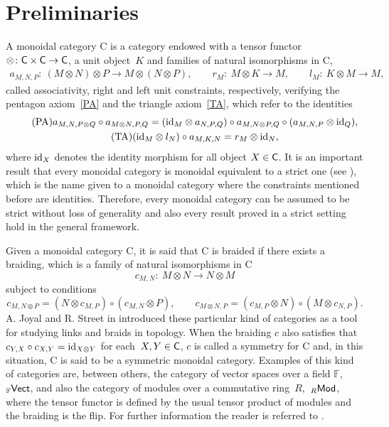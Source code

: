 \documentclass[pdftex]{sigma}
\numberwithin{equation}{section}
\newcommand{\ot}{\otimes}
\newcommand{\co}{\circ}
\begin{document}
\section{Preliminaries}
A monoidal category {\sf C} is a category endowed with a tensor functor $\otimes\colon {\sf C}\times{\sf C}\rightarrow {\sf C}$, a unit object~$K$ and families of natural isomorphisms in {\sf C},
\begin{gather*}
a_{M,N,P}\colon \ (M\ot N)\ot P\rightarrow M\ot (N\ot P),\qquad r_{M}\colon \ M\ot K\rightarrow M, \qquad l_{M}\colon \ K\ot M\rightarrow M,
\end{gather*}
called associativity, right and left unit constraints, respectively, verifying the pentagon axiom~\eqref{PA} and the triangle axiom~\eqref{TA}, which refer to the identities
\begin{gather}\label{PA}\tag{PA}
a_{M,N, P\ot Q}\co a_{M\ot N,P,Q}= ({\rm id}_{M}\ot a_{N,P,Q})\co a_{M,N\ot P,Q}\co (a_{M,N,P}\ot {\rm id}_{Q}),\\
\label{TA}\tag{TA}
({\rm id}_{M}\ot l_{N})\co a_{M,K,N}=r_{M}\ot {\rm id}_{N},
\end{gather} where ${\rm id}_{X}$ denotes the identity morphism for all object $X\in {\sf C}$. It is an important result that every monoidal category is monoidal equivalent to a strict one (see \cite[Proposition XI.5.1]{K}), which is the name given to a monoidal category where the constraints mentioned before are identities. Therefore, every monoidal category can be assumed to be strict without loss of generality and also every result proved in a strict setting hold in the general framework.

Given a monoidal category {\sf C}, it is said that {\sf C} is braided if there exists a braiding, which is a family of natural isomorphisms in {\sf C}
\[
c_{M,N}\colon \ M\ot N\rightarrow N\ot M
\]
subject to conditions
\[
c_{M,N\ot P}= (N\ot c_{M,P})\co (c_{M,N}\ot P),\qquad
c_{M\ot N, P}= (c_{M,P}\ot N)\co (M\ot c_{N,P}).
\] A. Joyal and R. Street in \cite{JS2} introduced these particular kind of categories as a tool for studying links and braids in topology. When the braiding $c$ also satisfies that $c_{Y,X}\circ c_{X,Y}={\rm id}_{X\otimes Y}$ for each~$X,Y\in {\sf C}$, $c$ is called a symmetry for {\sf C} and, in this situation, {\sf C} is said to be a symmetric monoidal category. Examples of this kind of categories are, between others, the category of vector spaces over a field $\mathbb{F}$, ${}_{\mathbb{F}}{\sf Vect}$, and also the category of modules over a commutative ring~$R$,~${}_{R}{\sf Mod}$, where the tensor functor is defined by the usual tensor product of modules and the braiding is the flip. For further information the reader is referred to \cite{Mac}.
\end{document}
